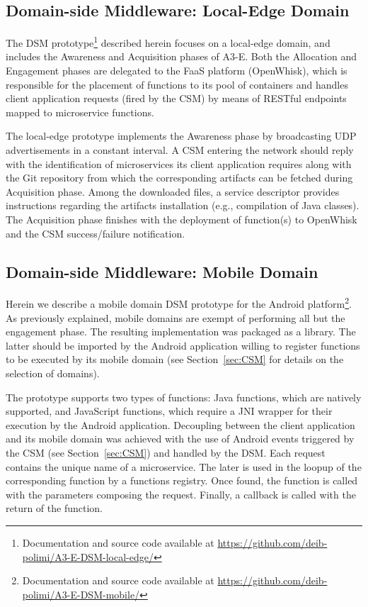 \subsection{Domain-side Middleware: Local-Edge Domain}\label{sec:local-edge-domain-DSM}


The DSM prototype\footnote{Documentation and source code available at \url{https://github.com/deib-polimi/A3-E-DSM-local-edge/}} described herein focuses on a local-edge domain, and includes the Awareness and Acquisition phases of A3-E. Both the Allocation and Engagement phases are delegated to the FaaS platform (OpenWhisk), which is responsible for the placement of functions to its pool of containers and handles client application requests (fired by the CSM) by means of RESTful endpoints mapped to microservice functions.

The local-edge prototype implements the Awareness phase by broadcasting UDP advertisements in a constant interval. A CSM entering the network should reply with the identification of microservices its client application requires along with the Git repository from which the corresponding artifacts can be fetched during Acquisition phase. Among the downloaded files, a service descriptor provides instructions regarding the artifacts installation (e.g., compilation of Java classes). The Acquisition phase finishes with the deployment of function(s) to OpenWhisk and the CSM success/failure notification. 

\subsection{Domain-side Middleware: Mobile Domain}\label{sec:mobile-domain-DSM}

Herein we describe a mobile domain DSM prototype for the Android platform\footnote{Documentation and source code available at \url{https://github.com/deib-polimi/A3-E-DSM-mobile/}}. As previously explained, mobile domains are exempt of performing all but the engagement phase. The resulting implementation was packaged as a library. The latter should be imported by the Android application willing to register functions to be executed by its mobile domain (see Section~\ref{sec:CSM} for details on the selection of domains).

The prototype supports two types of functions: Java functions, which are natively supported, and JavaScript functions, which require a JNI wrapper for their execution by the Android application. Decoupling between the client application and its mobile domain was achieved with the use of Android events triggered by the CSM (see Section~\ref{sec:CSM}) and handled by the DSM. Each request contains the unique name of a microservice. The later is used in the loopup of the corresponding function by a functions registry. Once found, the function is called with the parameters composing the request. Finally, a callback is called with the return of the function.